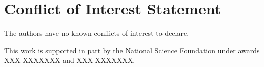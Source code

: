 \documentclass[manuscript,screen,review]{acmart}
\begin{document}
\section*{Conflict of Interest Statement}
The authors have no known conflicts of interest to declare. 

\begin{acks} 
This work is supported in part by the National Science Foundation under awards XXX-XXXXXXX and XXX-XXXXXXX.
\end{acks}




\end{document}

